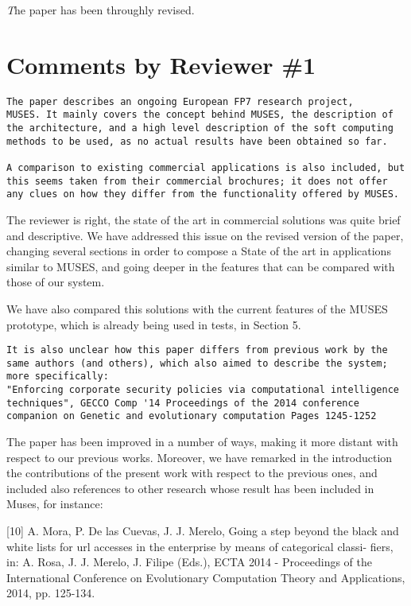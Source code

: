 \documentclass[preprint]{elsarticle}
\begin{document}
{\emph The paper has been throughly revised. 

\section{Comments by Reviewer \#1}

\begin{verbatim}
The paper describes an ongoing European FP7 research project,
MUSES. It mainly covers the concept behind MUSES, the description of
the architecture, and a high level description of the soft computing
methods to be used, as no actual results have been obtained so far. 

A comparison to existing commercial applications is also included, but
this seems taken from their commercial brochures; it does not offer
any clues on how they differ from the functionality offered by MUSES.
\end{verbatim}

The reviewer is right, the state of the art in commercial solutions was quite brief and descriptive.
We have addressed this issue on the revised version of the paper,
changing several sections in order to compose a State of the art in
applications similar to MUSES, and going deeper in the features that
can be compared with those of our system. 

We have also compared this solutions with the current features of the
MUSES prototype, which is already being used in tests, in Section 5.

\begin{verbatim}
It is also unclear how this paper differs from previous work by the
same authors (and others), which also aimed to describe the system;
more specifically: 
"Enforcing corporate security policies via computational intelligence
techniques", GECCO Comp '14 Proceedings of the 2014 conference
companion on Genetic and evolutionary computation Pages 1245-1252  
\end{verbatim}

The paper has been improved in a number of ways, making it more
distant with respect to our previous works. Moreover, we have remarked
in the introduction the contributions of the present work with
respect to the previous ones, and included also references to other
research whose result has been included in Muses, for instance:

[10] A. Mora, P. De las Cuevas, J. J.  Merelo, Going a step beyond the black and
white lists for url accesses in the enterprise by means of categorical classi-
fiers, in: A. Rosa, J. J. Merelo, J. Filipe (Eds.), ECTA 2014 - Proceedings
of the International Conference on Evolutionary Computation Theory and
Applications, 2014, pp. 125-134.


}
\end{document}
